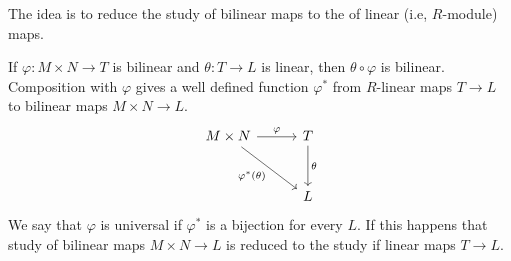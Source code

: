The idea is to reduce the study of bilinear maps to the of linear (i.e, $R$-module)
maps.

If $\varphi\colon M\times N\to T$ is bilinear and $\theta\colon T\to L$ is
linear, then $\theta \circ \varphi$ is bilinear. Composition with $\varphi$
gives a well defined function $\varphi^*$ from  $R$-linear maps $T\to L$ to
bilinear maps $M\times N\to L$.
\[\begin{tikzcd}[row sep=1cm, column sep=1cm]
	M\times N\ar[r, "\varphi"]\ar[dr, "\varphi^*(\theta)" below left] & T\ar[d, "\theta"]\\
	& L
\end{tikzcd}\]
We say that $\varphi$ is universal if $\varphi^*$ is a bijection for every $L$.
If this happens that study of bilinear maps $M\times N\to L$ is reduced to
the study if linear maps $T\to L$.
